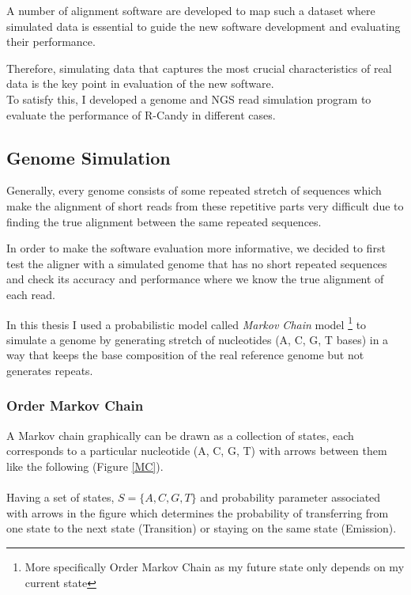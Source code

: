 \documentclass[11pt,a4paper]{report}
\begin{document}
A number of alignment software are developed to map such a dataset where 
simulated data is essential to guide the new software development and 
evaluating their performance.

Therefore, simulating data that captures the most crucial characteristics 
of real data is the key point in evaluation of the new software.\\

To satisfy this, I developed a genome and NGS read simulation program to evaluate 
the performance of R-Candy in different cases.

\subsection{Genome Simulation}

Generally, every genome consists of some repeated stretch of sequences which make 
the alignment of short reads from these repetitive parts very difficult due to 
finding the true alignment between the same repeated sequences.

In order to make the software evaluation more informative, we decided to first 
test the aligner with a simulated genome that has no short repeated sequences 
and check its accuracy and performance where we know the true alignment of each 
read.

In this thesis I used a probabilistic model called \emph{Markov Chain} model 
\footnote{More specifically  Order Markov Chain as my future state only 
depends on my current state} to simulate a genome by generating stretch of 
nucleotides (A, C, G, T bases) in a way that  keeps the base composition of the 
real reference genome but not generates repeats.


\subsubsection{ Order Markov Chain}
A Markov chain graphically can be drawn as a collection of states, 
each corresponds to a particular nucleotide (A, C, G, T) with arrows
between them like the following (Figure \ref{MC}). 
\\\\ 
Having a set of states,  $ S= \{ A, C,  G, T \}$  and probability
parameter  associated with arrows in the figure which determines the
probability of transferring from one state to the next state (Transition)
or staying on the same state (Emission).
\end{document}
